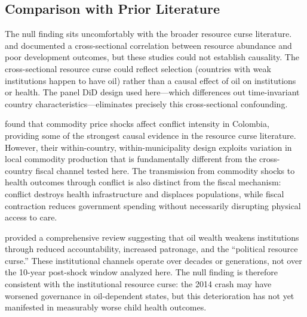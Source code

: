 \documentclass[12pt]{article}
\begin{document}
\subsection{Comparison with Prior Literature}

The null finding sits uncomfortably with the broader resource curse literature. \citet{sachs1995natural} and \citet{sachs2001curse} documented a cross-sectional correlation between resource abundance and poor development outcomes, but these studies could not establish causality. The cross-sectional resource curse could reflect selection (countries with weak institutions happen to have oil) rather than a causal effect of oil on institutions or health. The panel DiD design used here---which differences out time-invariant country characteristics---eliminates precisely this cross-sectional confounding.

\citet{dube2013commodity} found that commodity price shocks affect conflict intensity in Colombia, providing some of the strongest causal evidence in the resource curse literature. However, their within-country, within-municipality design exploits variation in local commodity production that is fundamentally different from the cross-country fiscal channel tested here. The transmission from commodity shocks to health outcomes through conflict is also distinct from the fiscal mechanism: conflict destroys health infrastructure and displaces populations, while fiscal contraction reduces government spending without necessarily disrupting physical access to care.

\citet{ross2015resource} provided a comprehensive review suggesting that oil wealth weakens institutions through reduced accountability, increased patronage, and the ``political resource curse.'' These institutional channels operate over decades or generations, not over the 10-year post-shock window analyzed here. The null finding is therefore consistent with the institutional resource curse: the 2014 crash may have worsened governance in oil-dependent states, but this deterioration has not yet manifested in measurably worse child health outcomes.
\end{document}
